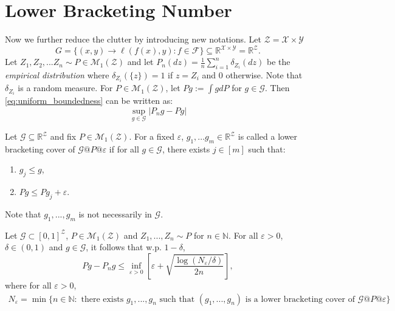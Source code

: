 \documentclass[twoside]{article}
\begin{document}
\section{Lower Bracketing Number}
Now we further reduce the clutter by introducing new notations. Let $\mathcal Z=\mathcal X\times \mathcal Y$
\begin{equation*}
   G = \{(x,y)\to \ell(f(x),y):f\in \mathcal F\}\subseteq \mathbb R^{\mathcal X\times\mathcal Y}=\mathbb R^{\mathcal Z}.
\end{equation*}
Let $Z_1,Z_2,...Z_n\sim P\in \mathcal M_1(\mathcal Z)$ and let $P_n(dz)=\frac{1}{n}\sum_{i=1}^n \delta_{Z_i}(dz)$ be the \textit{empirical distribution} where $\delta_{Z_i}(\{z\})=1$ if $z=Z_i$ and $0$ otherwise. Note that $\delta_{Z_i}$ is a random measure. For $P\in\mathcal M_1(\mathcal Z)$, let $Pg:=\int gdP$ for $g\in \mathcal G$. Then \cref{eq:uniform_boundedness} can be written as:
\begin{equation*}
   \sup_{g\in \mathcal G}\left|P_ng - Pg\right|
\end{equation*}
\begin{definition}\label{defn:lower_bracketing_cover}
   Let $\mathcal G \subseteq \mathbb R^\mathcal Z$ and fix $P\in \mathcal M_1(\mathcal Z)$. For a fixed $\varepsilon$, $g_1,...g_m\in \mathbb R^\mathcal Z$ is called a lower bracketing cover of $\mathcal G\text{@}P\text{@}\varepsilon$ if for all $g\in \mathcal G$, there exists $j\in [m]$ such that:
   \begin{enumerate}
      \item $g_j\le g$,
      \item $Pg\le Pg_j+\varepsilon$.
   \end{enumerate}
   Note that $g_1,...,g_m$ is not necessarily in $\mathcal G$.
\end{definition}
\begin{theorem}\label{thm:lbn}
   Let $\mathcal G\subset [0,1]^\mathcal Z$, $P\in \mathcal M_1(\mathcal Z)$ and $Z_1,...,Z_n\sim P$ for $n\in \mathbb N$. For all $\varepsilon>0$, $\delta\in (0,1)$ and $g\in \mathcal G$, it follows that w.p. $1-\delta$,
   \begin{equation*}
      Pg-P_ng\le \inf_{\varepsilon>0}\left[\varepsilon+\sqrt{\frac{\log(N_\varepsilon/\delta)}{2n}}\right],
   \end{equation*}
   where for all $\varepsilon>0$, 
   \begin{align*}
      N_\varepsilon =\min\{n\in \mathbb N: \text{ there exists }g_1,...,g_n \text{ such that }(g_1,...,g_n) \text{ is a lower bracketing cover of }\mathcal G\text{@}P\text{@}\varepsilon\}
   \end{align*}
\end{theorem}
\end{document}
